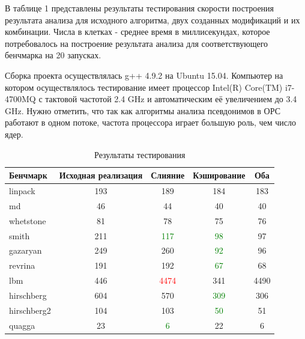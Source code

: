 \Conc

В таблице 1 представлены результаты тестирования скорости построения результата анализа для исходного алгоритма, двух созданных модификаций и их комбинации. Числа в клетках - среднее время в миллисекундах, которое потребовалось на построение результата анализа для соответствующего бенчмарка на 20 запусках.

Сборка проекта осуществлялась g++ 4.9.2 на Ubuntu 15.04. Компьютер на котором осуществлялось тестирование имеет процессор Intel(R) Core(TM) i7-4700MQ с тактовой частотой 2.4 GHz и автоматическим её увеличением до 3.4 GHz. Нужно отметить, что так как алгоритмы анализа псевдонимов в ОРС работают в одном потоке, частота процессора играет большую роль, чем число ядер.

\begin{table}[h!]
\begin{tabular}{l | c | c | c | c }
Бенчмарк & Исходная реализация & Слияние & Кэширование & Оба \\
\hline \hline
linpack     & 193 & 189                    & 184                    & 183 \\
md          & 46  & 44                     & 40                     & 40\\ 
whetstone   & 81  & 78                     & 75                     & 76\\
smith       & 211 & \textcolor{green}{117} & \textcolor{green}{98}  & 97\\
gazaryan    & 249 & 260                    & \textcolor{green}{92}  & 96\\
revrina     & 191 & 192                    & \textcolor{green}{67}  & 68\\
lbm         & 446 & \textcolor{red}{4474}  & 341                    & 4490\\
hirschberg  & 604 & 570                    & \textcolor{green}{309} & 306\\
hirschberg2 & 104 & 103                    & \textcolor{green}{50}  & 51\\
quagga      & 23  & \textcolor{green}{6}   & 22                     & 6
\end{tabular}
\caption{Результаты тестирования}
\label{tabl:Profiling}
\end{table}

\newpage %

\printbibliography[
    heading=bibintoc%
    ,title=Библиография %
]


